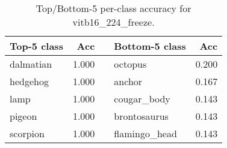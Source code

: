 \begin{table}[h]
  \centering
  \begin{tabular}{l r c l r}
    \toprule
    \textbf{Top-5 class} & \textbf{Acc} & & \textbf{Bottom-5 class} & \textbf{Acc}\\
    \midrule
    dalmatian & 1.000 & & octopus & 0.200\\
    hedgehog & 1.000 & & anchor & 0.167\\
    lamp & 1.000 & & cougar_body & 0.143\\
    pigeon & 1.000 & & brontosaurus & 0.143\\
    scorpion & 1.000 & & flamingo_head & 0.143\\
    \bottomrule
  \end{tabular}
  \caption{Top/Bottom-5 per-class accuracy for vitb16_224_freeze.}
  \label{tab:perclass_vitb16_224_freeze}
\end{table}